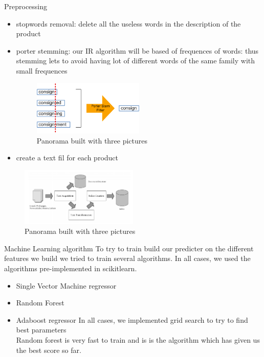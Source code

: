 \documentclass{beamer}
\newlength\postercolumnwidth
\newlength\totalwidth
\begin{document}
\begin{frame}[t]{}
\begin{columns}[totalwidth=\totalwidth]
\begin{column}[t]{\postercolumnwidth}
\begin{block}{Preprocessing}
\begin{itemize}
\item stopwords removal: delete all the useless words in the description of the product
\item porter stemming: our IR algorithm will be based of frequences of words: thus stemming lets to avoid having lot of different words of the same family with small frequences
  \begin{figure}[H]
\center
\includegraphics[width=0.5\textwidth]{figure3}
\caption{ Panorama built with three pictures}
\end{figure}
\item create a text fil for each product
\end{itemize}
   \begin{figure}[H]
\center
\includegraphics[width=0.5\textwidth]{index}
\caption{ Panorama built with three pictures}
\end{figure}
    \end{block}


    \begin{block}{Machine Learning algorithm}
\small
To try to train build our predicter on the different features we build we tried to train several algorithms. In all cases, we used the algorithms pre-implemented in scikitlearn.  
\begin{itemize}
\item Single Vector Machine regressor
\item Random Forest 
\item Adaboost regressor
In all cases, we implemented grid search to try to find best parameters
\\
Random forest is very fast to train and is is the algorithm which has given us the best score so far. 
\end{itemize}


    \end{block} 


\end{column}
\end{columns}
\end{frame}
\end{document}
